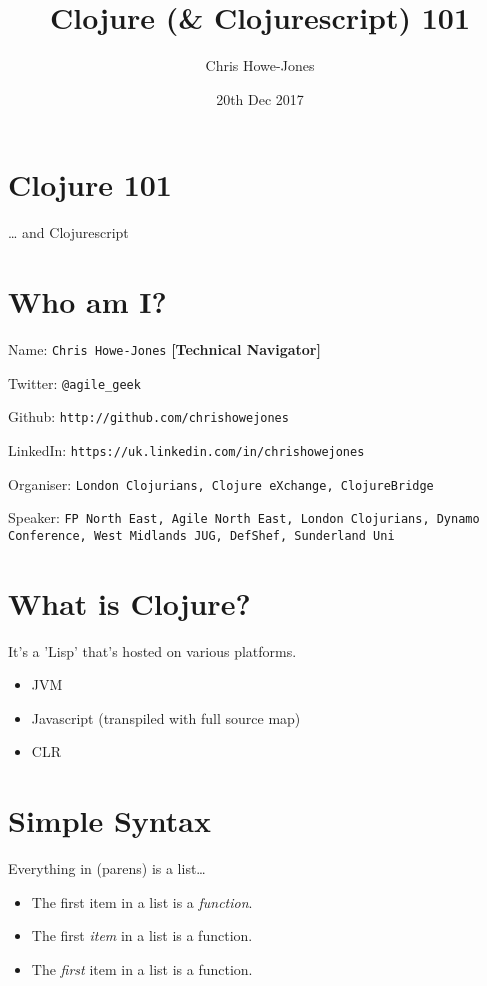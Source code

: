 \documentclass[11pt]{article}
\author{Chris Howe-Jones}
\date{20th Dec 2017}
\title{Clojure (\& Clojurescript) 101}
\begin{document}
\maketitle
\section*{Clojure 101}
\label{sec:org84a5db0}

\ldots{} and Clojurescript

\section*{Who am I?}
\label{sec:org8e36379}

Name:      \texttt{Chris Howe-Jones} \textbf{[Technical Navigator]}

Twitter:   \texttt{@agile\_geek}

Github:    \texttt{http://github.com/chrishowejones}

LinkedIn:  \texttt{https://uk.linkedin.com/in/chrishowejones}

Organiser: \texttt{London Clojurians, Clojure eXchange, ClojureBridge}

Speaker:   \texttt{FP North East, Agile North East, London Clojurians,
  Dynamo Conference, West Midlands JUG, DefShef, Sunderland Uni}

\section*{What is Clojure?}
\label{sec:org24ec665}

It's a 'Lisp' that's hosted on various platforms.

\begin{itemize}
\item JVM
\item Javascript (transpiled with full source map)
\item CLR
\end{itemize}

\section*{Simple Syntax}
\label{sec:orgf97ff2e}

Everything in (parens) is a list\ldots{}

\begin{itemize}
\item The first item in a list is a \emph{function}.
\end{itemize}
\begin{itemize}
\item The first \emph{item} in a list is a function.
\end{itemize}
\begin{itemize}
\item The \emph{first} item in a list is a function.
\end{itemize}
\end{document}
